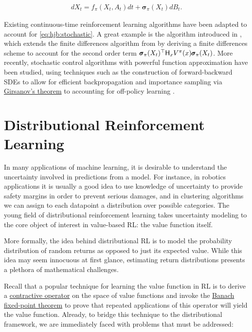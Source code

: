 \begin{align*}
  dX_t = f_\pi(X_t, A_t)dt + \pmb{\sigma}_\pi(X_t)dB_t.
\end{align*}

Existing continuous-time reinforcement learning algorithms have been
adapted to account for \eqref{eq:hjb:stochastic}. A great example is
the algorithm introduced in \citet{munos1997reinforcement}, which
extends the finite differences algorithm from \citet{Munos2004ASO} by
deriving a finite differences scheme to account for the second order
term
$\quadraticform{\pmb{\sigma}_\pi(X_t)}{\hessian{x}V^\pi(x)}$. More
recently, stochastic control algorithms with powerful function
approximation have been studied, using techniques such as the
construction of forward-backward SDEs to allow for efficient
backpropagation \citep{pereira2019learning} and importance sampling via
\hyperref[thm:girsanov]{Girsanov's theorem} to accounting for
off-policy learning \citep{exarchos2018stochastic}.

\section{Distributional Reinforcement Learning}\label{s:distributional-rl}
In many applications of machine learning, it is desirable to
understand the uncertainty involved in predictions from a model. For
instance, in robotics applications it is usually a good idea to use
knowledge of uncertainty to provide safety margins in order to prevent
serious damages, and in clustering algorithms we can assign to each
datapoint a distribution over possible categories. The young field of
distributional reinforcement learning takes uncertainty modeling to
the core object of interest in value-based RL: the value function itself.

More formally, the idea behind distributional RL is to model the
probability distribution of random returns as opposed to just its
expected value. While this idea may seem innocuous at first glance, estimating
return distributions presents a plethora of mathematical challenges.

Recall that a popular technique for learning the value function in RL
is to derive a \hyperref[def:contraction]{contractive operator} on the
space of value functions and invoke the
\hyperref[thm:banach-fixed-point]{Banach fixed-point theorem} to prove
that repeated applications of this operator will yield the value
function. Already, to bridge this technique to the distributional
framework, we are immediately faced with problems that must be addressed:

